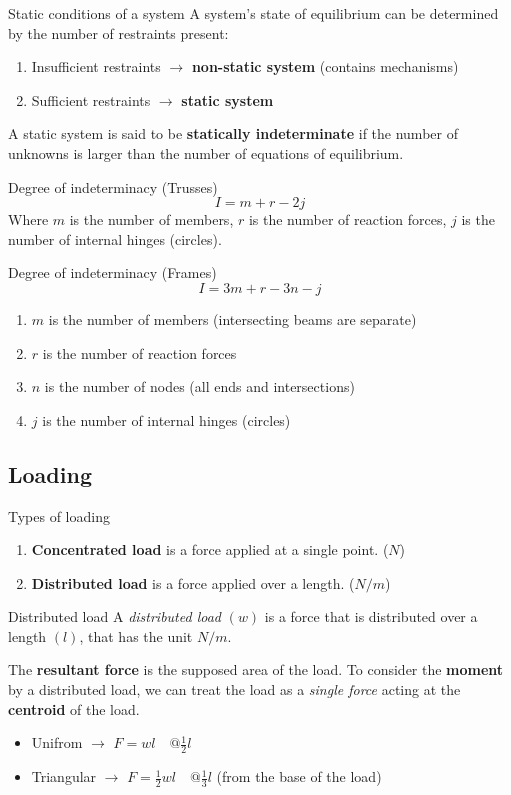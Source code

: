 \begin{definition}
    {Static conditions of a system}
    A system's state of equilibrium can be determined by the number of restraints present:
    \begin{enumerate}
        \item Insufficient restraints $\to$ \textbf{non-static system} (contains mechanisms)
        \item Sufficient restraints $\to$ \textbf{static system}
    \end{enumerate}
    A static system is said to be \textbf{statically indeterminate} if the number of unknowns is larger than the number of equations of equilibrium.
\end{definition}
\begin{theorem}
    {Degree of indeterminacy (Trusses)}
    \[I=m+r-2j\]
    Where $m$ is the number of members, $r$ is the number of reaction forces, $j$ is the number of internal hinges (circles).
\end{theorem}
\begin{theorem}
    {Degree of indeterminacy (Frames)}
    \[I=3m+r-3n-j\]
    \begin{enumerate}
        \item $m$ is the number of members (intersecting beams are separate)
        \item $r$ is the number of reaction forces
        \item $n$ is the number of nodes (all ends and intersections)
        \item $j$ is the number of internal hinges (circles)
    \end{enumerate}
\end{theorem}

\subsection{Loading}
\begin{knBox}
    {Types of loading}
    \begin{enumerate}
        \item \textbf{Concentrated load} is a force applied at a single point. ($N$)
        \item \textbf{Distributed load} is a force applied over a length. ($N/m$)
    \end{enumerate}
\end{knBox}
\begin{theorem}
    {Distributed load}
    A \emph{distributed load} $(w)$ is a force that is distributed over a length $(l)$, that has the unit $N/m$.

    The \textbf{resultant force} is the supposed area of the load. To consider the \textbf{moment} by a distributed load, we can treat the load as a \emph{single force} acting at the \textbf{centroid} of the load.
    \begin{itemize}
        \item Unifrom $\to$ $F=wl\quad @\frac{1}{2}l$
        \item Triangular $\to$ $F=\frac{1}{2}wl\quad @ \frac{1}{3}l$  (from the base of the load)
    \end{itemize}
\end{theorem}

